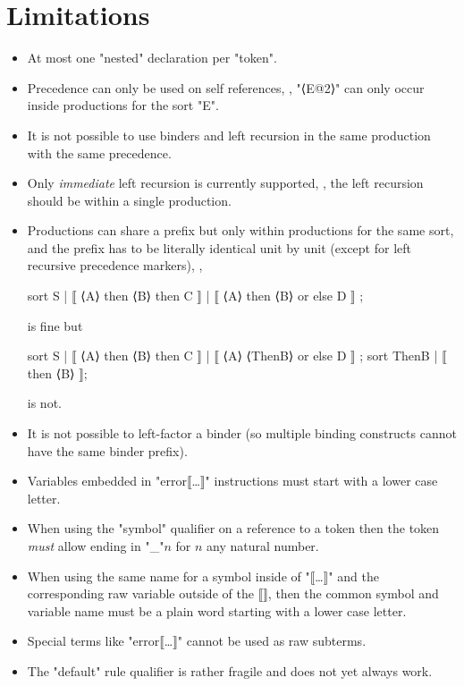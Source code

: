 \documentclass[11pt]{article} %
\begin{document}
\section{Limitations}\label{app:limits}

\begin{itemize}

\item At most one "nested" declaration per "token".

\item Precedence can only be used on self references, \ie, "⟨E@2⟩" can only occur inside
  productions for the sort "E".

\item It is not possible to use binders and left recursion in the same production with the same
  precedence.

\item Only \emph{immediate} left recursion is currently supported, \ie, the left recursion should be
  within a single production.

\item Productions can share a prefix but only within productions for the same sort, and the prefix
  has to be literally identical unit by unit (except for left recursive precedence markers), \ie,
  \begin{code}
sort S | ⟦ ⟨A⟩ then ⟨B⟩ then C ⟧
       | ⟦ ⟨A⟩ then ⟨B⟩ or else D ⟧ ;
\end{code}
is fine but
\begin{code}
sort S | ⟦ ⟨A⟩ then ⟨B⟩ then C ⟧
       | ⟦ ⟨A⟩ ⟨ThenB⟩ or else D ⟧ ;
sort ThenB | ⟦ then ⟨B⟩ ⟧;
\end{code}
is not.

\item It is not possible to left-factor a binder (so multiple binding constructs cannot have the
  same binder prefix).

\item Variables embedded in "error⟦…⟧" instructions must start with a lower case letter.

\item When using the "symbol" qualifier on a reference to a token then the token \emph{must} allow
  ending in "_"$n$ for $n$ any natural number.

\item When using the same name for a symbol inside of "⟦…⟧" and the corresponding raw variable
  outside of the ⟦⟧, then the common symbol and variable name must be a plain word starting with a
  lower case letter.

\item Special terms like "error⟦…⟧" cannot be used as raw subterms.

\item The "default" rule qualifier is rather fragile and does not yet always work.

\end{itemize}



\end{document}
